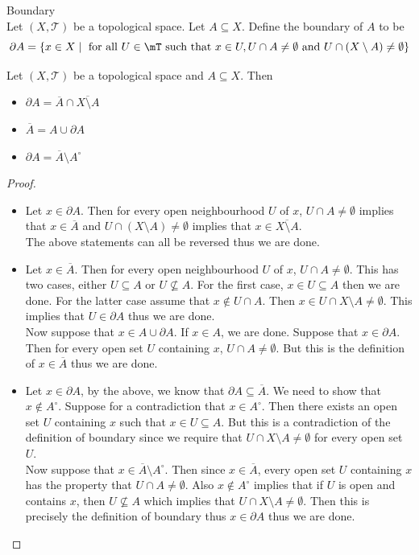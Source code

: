 \documentclass[a4paper]{article}
\begin{document}
\begin{defn}{Boundary}{}\\
Let $(X,\mathcal{T})$ be a topological space. Let $A\subseteq X$. Define the boundary of $A$ to be $$\partial A=\{x\in X\;|\;\text{ for all }U\in\mT\text{ such that }x\in U,U\cap A\neq\emptyset\text{ and }U\cap(X\setminus A)\neq\emptyset\}$$
\end{defn}

\begin{prp}{}{} Let $(X,\mathcal{T})$ be a topological space and $A\subseteq X$. Then 
\begin{itemize}
\item $\partial A=\overline{A}\cap\overline{X\setminus A}$
\item $\overline{A}=A\cup\partial A$
\item $\partial A=\overline{A}\setminus A^\circ$
\end{itemize} 
\begin{proof}\\
\begin{itemize}
\item Let $x\in\partial A$. Then for every open neighbourhood $U$ of $x$, $U\cap A\neq\emptyset$ implies that $x\in\overline{A}$ and $U\cap(X\setminus A)\neq\emptyset$ implies that $x\in\overline{X\setminus A}$. \\
The above statements can all be reversed thus we are done. 
\item Let $x\in\overline{A}$. Then for every open neighbourhood $U$ of $x$, $U\cap A\neq\emptyset$. This has two cases, either $U\subseteq A$ or $U\not\subseteq A$. For the first case, $x\in U\subseteq A$ then we are done. For the latter case assume that $x\notin U\cap A$. Then $x\in U\cap X\setminus A\neq\emptyset$. This implies that $U\in\partial A$ thus we are done. \\
Now suppose that $x\in A\cup\partial A$. If $x\in A$, we are done. Suppose that $x\in\partial A$. Then for every open set $U$ containing $x$, $U\cap A\neq\emptyset$. But this is the definition of $x\in\overline{A}$ thus we are done. 
\item Let $x\in\partial A$, by the above, we know that $\partial A\subseteq\overline{A}$. We need to show that $x\notin A^\circ$. Suppose for a contradiction that $x\in A^\circ$. Then there exists an open set $U$ containing $x$ such that $x\in U\subseteq A$. But this is a contradiction of the definition of boundary since we require that $U\cap X\setminus A\neq\emptyset$ for every open set $U$. \\
Now suppose that $x\in\overline{A}\setminus A^\circ$. Then since $x\in\overline{A}$, every open set $U$ containing $x$ has the property that $U\cap A\neq\emptyset$. Also $x\notin A^\circ$ implies that if $U$ is open and contains $x$, then $U\not\subseteq A$ which implies that $U\cap X\setminus A\neq\emptyset$. Then this is precisely the definition of boundary thus $x\in\partial A$ thus we are done. 
\end{itemize}
\end{proof}
\end{prp}
\end{document}
